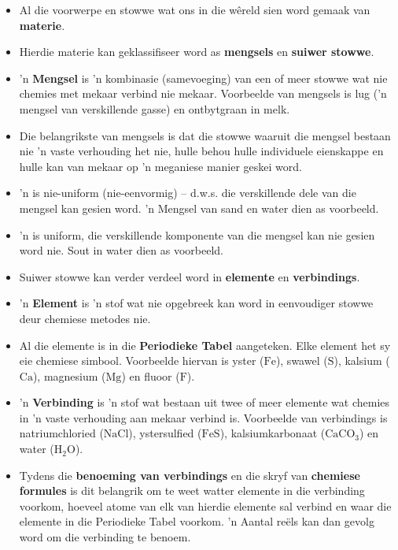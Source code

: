       \label{m38706*id67458}\begin{itemize}[noitemsep]

            \label{m38706*uid114}\item Al die voorwerpe en stowwe wat ons in die wêreld sien word gemaak van \textbf{materie}.
\label{m38706*uid115}\item Hierdie materie kan geklassifiseer word as \textbf{mengsels} en \textbf{suiwer stowwe}.
\label{m38706*uid116}\item 'n \textbf{Mengsel} is 'n kombinasie (samevoeging) van een of meer stowwe wat nie chemies met mekaar verbind nie mekaar. Voorbeelde van mengsels is lug ('n mengsel van verskillende gasse) en ontbytgraan in melk.
\label{m38706*uid117}\item Die belangrikste  van mengsels is dat die stowwe waaruit die mengsel bestaan nie 'n vaste verhouding het nie, hulle behou hulle individuele eienskappe en hulle kan van mekaar op 'n meganiese manier geskei word.
\label{m38706*uid118}\item 'n  is nie-uniform (nie-eenvormig) – d.w.s. die verskillende dele van die mengsel kan gesien word. 'n Mengsel van sand en water dien as voorbeeld.
\label{m38706*uid119}\item 'n  is uniform, die verskillende komponente van die mengsel kan nie gesien word nie. Sout in water dien as voorbeeld.
\label{m38706*uid121}\item Suiwer stowwe kan verder verdeel word in \textbf{elemente} en \textbf{verbindings}.
\label{m38706*uid122}\item 'n \textbf{Element} is 'n stof wat nie opgebreek kan word in eenvoudiger stowwe deur chemiese metodes nie.
\label{m38706*uid123}\item Al die elemente is in die \textbf{Periodieke Tabel} aangeteken. Elke element het sy eie chemiese simbool. Voorbeelde hiervan is yster ($\text{Fe}$), swawel ($\text{S}$), kalsium ($\text{Ca}$), magnesium ($\text{Mg}$) en fluoor ($\text{F}$).
\label{m38706*uid124}\item 'n \textbf{Verbinding} is 'n stof wat bestaan uit twee of meer elemente wat chemies
       in 'n vaste verhouding aan mekaar verbind is. Voorbeelde van verbindings is natriumchloried ($\text{NaCl}$),
       ystersulfied ($\text{FeS}$), kalsiumkarbonaat (${\text{CaCO}}_{3}$) en water (${\text{H}}_{2}\text{O}$).
\label{m38706*uid125}\item Tydens die \textbf{benoeming van verbindings} en die skryf van \textbf{chemiese formules} is dit belangrik om  te weet watter elemente in die verbinding voorkom, hoeveel atome van elk van hierdie elemente sal verbind en waar die elemente in die Periodieke Tabel voorkom. 'n Aantal re\"els kan dan gevolg word om die verbinding te benoem.

\end{itemize}
